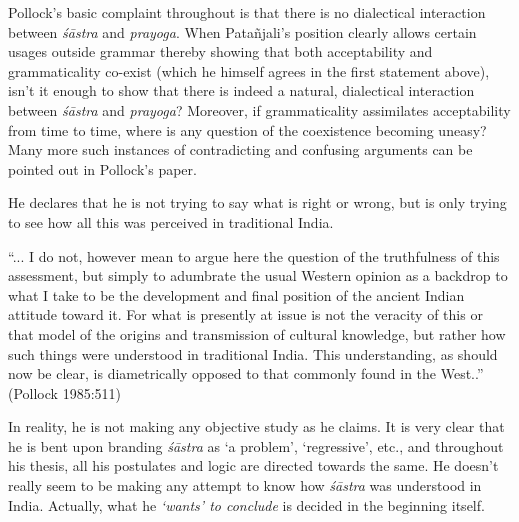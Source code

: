 Pollock's basic complaint throughout is that there is no dialectical interaction between {\it śāstra} and {\it prayoga}. When Patañjali’s position clearly allows certain usages outside grammar thereby showing that both acceptability and grammaticality co-exist (which he himself agrees in the first statement above), isn't it enough to show that there is indeed a natural, dialectical interaction between {\it śāstra} and {\it prayoga}? Moreover, if grammaticality assimilates acceptability from time to time, where is any question of the coexistence becoming uneasy? Many more such instances of contradicting and confusing arguments can be pointed out in Pollock's paper.

He declares that he is not trying to say what is right or wrong, but is only trying to see how all this was perceived in traditional India. 
\begin{myquote}
``... I do not, however mean to argue here the question of the truthfulness of this assessment, but simply to adumbrate the usual Western opinion as a backdrop to what I take to be the development and final position of the ancient Indian attitude toward it. For what is presently at issue is not the veracity of this or that model of the origins and transmission of cultural knowledge, but rather how such things were understood in traditional India. This understanding, as should now be clear, is diametrically opposed to that commonly found in the West..'' (Pollock 1985:511)
\end{myquote}

In reality, he is not making any objective study as he claims. It is very clear that he is bent upon branding {\it śāstra} as `a problem', `regressive', etc., and throughout his thesis, all his postulates  and logic are directed towards the same. He doesn't really seem to be making any attempt to know how {\it śāstra} was understood in India. Actually, what he \textit{`wants' to conclude} is decided in the beginning itself. 

